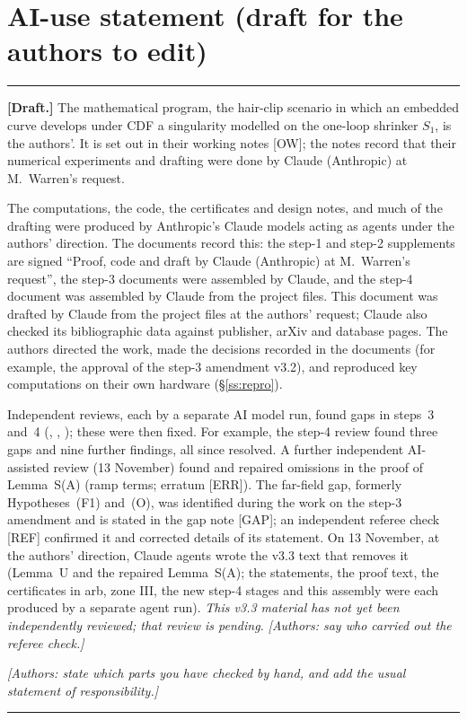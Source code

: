 \documentclass[11pt]{amsart}
\theoremstyle{definition}
\theoremstyle{remark}
\newcommand{\fn}[1]{\texttt{\detokenize{#1}}}
\newcommand{\dref}[1]{[\textsf{#1}]}
\begin{document}
\section{AI-use statement (draft for the authors to edit)}\label{s:ai}
\noindent\rule{\linewidth}{0.4pt}\par\nobreak\smallskip
{\small\textbf{[Draft.]} The mathematical program, the hair-clip scenario in which an embedded curve develops under CDF a singularity modelled on the one-loop shrinker $S_1$, is the authors'. It is set out in their working notes \dref{OW}; the notes record that their numerical experiments and drafting were done by Claude (Anthropic) at M.~Warren's request.

The computations, the code, the certificates and design notes, and much of the drafting were produced by Anthropic's Claude models acting as agents under the authors' direction. The documents record this: the step-1 and step-2 supplements are signed ``Proof, code and draft by Claude (Anthropic) at M.~Warren's request'', the step-3 documents were assembled by Claude, and the step-4 document was assembled by Claude from the project files. This document was drafted by Claude from the project files at the authors' request; Claude also checked its bibliographic data against publisher, arXiv and database pages. The authors directed the work, made the decisions recorded in the documents (for example, the approval of the step-3 amendment v3.2), and reproduced key computations on their own hardware (\S\ref{ss:repro}).

Independent reviews, each by a separate AI model run, found gaps in steps~3 and~4 (\fn{STEP3_REVIEW.md}, \fn{STEP3_REVIEW2.md}, \fn{STEP4_REVIEW.md}); these were then fixed. For example, the step-4 review found three gaps and nine further findings, all since resolved. A further independent AI-assisted review (13 November) found and repaired omissions in the proof of Lemma~S(A) (ramp terms; erratum \dref{ERR}). The far-field gap, formerly Hypotheses~(F1) and~(O), was identified during the work on the step-3 amendment and is stated in the gap note \dref{GAP}; an independent referee check \dref{REF} confirmed it and corrected details of its statement. On 13 November, at the authors' direction, Claude agents wrote the v3.3 text that removes it (Lemma~U and the repaired Lemma~S(A); the statements, the proof text, the certificates in arb, zone III, the new step-4 stages and this assembly were each produced by a separate agent run). \emph{This v3.3 material has not yet been independently reviewed; that review is pending.} \emph{[Authors: say who carried out the referee check.]}

\emph{[Authors: state which parts you have checked by hand, and add the usual statement of responsibility.]}\par}
\noindent\rule{\linewidth}{0.4pt}
\end{document}
